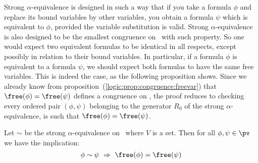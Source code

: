 Strong $\alpha$-equivalence is designed in such a way that if
you take a formula $\phi$ and replace its bound variables by other
variables, you obtain a formula $\psi$ which is equivalent to
$\phi$, provided the variable substitution is valid. Strong
$\alpha$-equivalence is also designed to be the smallest
congruence on \pv\ with such property. So one would expect two
equivalent formulas to be identical in all respects, except possibly
in relation to their bound variables. In particular, if a formula
$\phi$ is equivalent to a formula $\psi$, we should expect both
formulas to have the same free variables. This is indeed the case,
as the following proposition shows. Since we already know from
proposition~(\ref{logic:prop:congruence:freevar}) that
$\free(\phi)=\free(\psi)$ defines a congruence on \pv, the proof
reduces to checking every ordered pair $(\phi,\psi)$
belonging to the generator $R_{0}$ of the strong $\alpha$-equivalence, 
is such that $\free(\phi)=\free(\psi)$.
\begin{prop}\label{logic:prop:strong:freevar}
Let $\sim$ be the strong $\alpha$-equivalence on \pv\ where $V$
is a set. Then for all $\phi,\psi\in\pv$ we have the implication:
    \[
    \phi\sim\psi\ \Rightarrow\ \free(\phi)=\free(\psi)
    \]
\end{prop}
